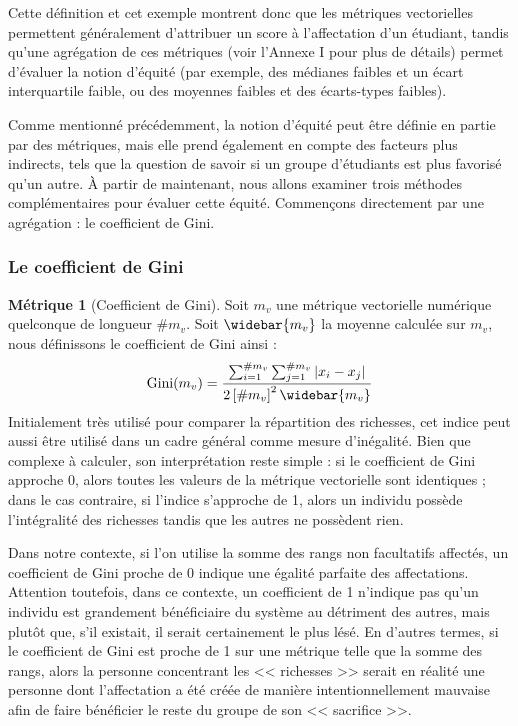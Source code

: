 \documentclass{rapport}
\theoremstyle{definition}
\theoremstyle{remark}
\theoremstyle{plain}
\theoremstyle{definition}
\newtheorem*{metric}{Métrique}
\theoremstyle{definition}
\theoremstyle{remark}
\theoremstyle{definition}
\begin{document}
Cette définition et cet exemple montrent donc que les métriques vectorielles permettent généralement d'attribuer un score à l'affectation d'un étudiant, tandis qu'une agrégation de ces métriques (voir l'Annexe I pour plus de détails) permet d'évaluer la notion d'équité (par exemple, des médianes faibles et un écart interquartile faible, ou des moyennes faibles et des écarts-types faibles).

Comme mentionné précédemment, la notion d'équité peut être définie en partie par des métriques, mais elle prend également en compte des facteurs plus indirects, tels que la question de savoir si un groupe d'étudiants est plus favorisé qu'un autre. À partir de maintenant, nous allons examiner trois méthodes complémentaires pour évaluer cette équité.
Commençons directement par une agrégation : le coefficient de Gini.

\subsubsection{Le coefficient de Gini}
\begin{metric}[Coefficient de Gini]
    Soit $m_v$ une métrique vectorielle numérique quelconque de longueur $\#m_v$. Soit $\widebar{m_v}$ la moyenne calculée sur $m_v$, nous définissons le coefficient de Gini ainsi :
    $$
        \text{Gini}(m_v) = \frac{\sum_{i=1}^{\#m_v}\sum_{j=1}^{\#m_v}\left|x_i-x_j\right|}{2\left[\#m_v\right]^2\widebar{m_v}}
    $$
    Initialement très utilisé pour comparer la répartition des richesses, cet indice peut aussi être utilisé dans un cadre général comme mesure d'inégalité.
    Bien que complexe à calculer, son interprétation reste simple : si le coefficient de Gini approche 0, alors toutes les valeurs de la métrique vectorielle sont identiques ; dans le cas contraire, si l'indice s'approche de 1, alors un individu possède l'intégralité des richesses tandis que les autres ne possèdent rien.

    Dans notre contexte, si l'on utilise la somme des rangs non facultatifs affectés, un coefficient de Gini proche de 0 indique une égalité parfaite des affectations.
    Attention toutefois, dans ce contexte, un coefficient de 1 n'indique pas qu'un individu est grandement bénéficiaire du système au détriment des autres, mais plutôt que, s'il existait, il serait certainement le plus lésé.
    En d'autres termes, si le coefficient de Gini est proche de 1 sur une métrique telle que la somme des rangs, alors la personne concentrant les << richesses >> serait en réalité une personne dont l'affectation a été créée de manière intentionnellement mauvaise afin de faire bénéficier le reste du groupe de son << sacrifice >>.
\end{metric}
\end{document}
